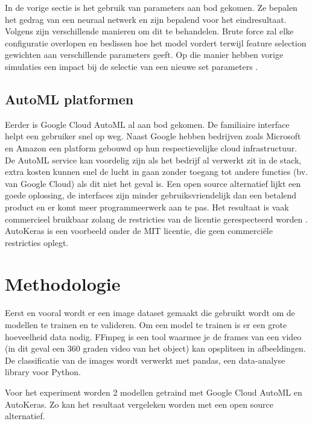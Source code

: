 In de vorige sectie is het gebruik van parameters aan bod gekomen. Ze bepalen het gedrag van een neuraal netwerk en zijn bepalend voor het eindresultaat. Volgens \textcite{Brust2019} zijn verschillende manieren om dit te behandelen. Brute force zal elke configuratie overlopen en beslissen hoe het model vordert terwijl feature selection gewichten aan verschillende parameters geeft. Op die manier hebben vorige simulaties een impact bij de selectie van een nieuwe set parameters \autocite{Claesen2015}.

\subsection{AutoML platformen}

Eerder is Google Cloud AutoML al aan bod gekomen. De familiaire interface helpt een gebruiker snel op weg. Naast Google hebben bedrijven zoals Microsoft en Amazon een platform gebouwd op hun respectievelijke cloud infrastructuur. De AutoML service kan voordelig zijn als het bedrijf al verwerkt zit in de stack, extra kosten kunnen snel de lucht in gaan zonder toegang tot andere functies (bv. van Google Cloud) als dit niet het geval is. Een open source alternatief lijkt een goede oplossing, de interfaces zijn minder gebruiksvriendelijk dan een betalend product en er komt meer programmeerwerk aan te pas. Het resultaat is vaak commercieel bruikbaar zolang de restricties van de licentie gerespecteerd worden \autocite{Balter2015}. AutoKeras is een voorbeeld onder de MIT licentie, die geen commerciële restricties oplegt.

\section{Methodologie}
\label{sec:methodologie}

Eerst en vooral wordt er een image dataset gemaakt die gebruikt wordt om de modellen te trainen en te valideren. Om een model te trainen is er een grote hoeveelheid data nodig. FFmpeg is een tool waarmee je de frames van een video (in dit geval een 360 graden video van het object) kan opsplitsen in afbeeldingen. De classificatie van de images wordt verwerkt met pandas, een data-analyse library voor Python.

Voor het experiment worden 2 modellen getraind met Google Cloud AutoML en AutoKeras. Zo kan het resultaat vergeleken worden met een open source alternatief. 

